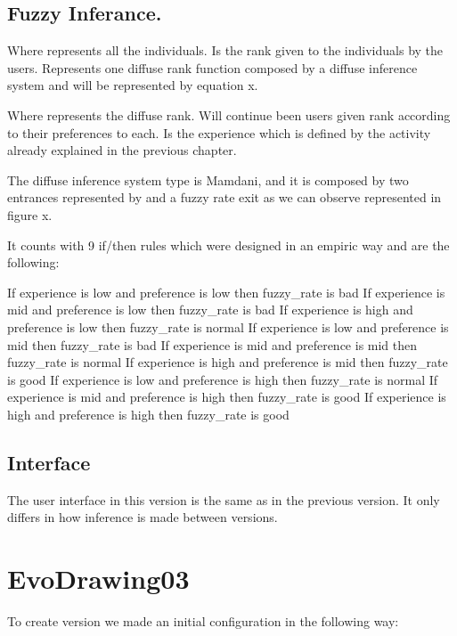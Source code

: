 \subsection{Fuzzy Inferance.}
Where represents all the individuals.
Is the rank given to the individuals by the users.
Represents one diffuse rank function composed by a diffuse inference system and will be represented by equation x.


Where represents the diffuse rank.
Will continue been users given rank according to their preferences to each.
Is the experience which is defined by the activity already explained in the previous chapter.

The diffuse inference system type is Mamdani, and it is composed by two entrances represented by and a fuzzy rate exit as we can observe represented in figure x.


It counts with 9 if/then rules which were designed in an empiric way and are the following:

If experience is low and preference is low then fuzzy\_rate is bad
If experience is mid and preference is low then fuzzy\_rate is bad
If experience is high and preference is low then fuzzy\_rate is normal
If experience is low and preference is mid then fuzzy\_rate is bad
If experience is mid and preference is mid then fuzzy\_rate is normal
If experience is high and preference is mid then fuzzy\_rate is good
If experience is low and preference is high then fuzzy\_rate is normal
If experience is mid and preference is high then fuzzy\_rate is good
If experience is high and preference is high then fuzzy\_rate is good

\subsection{Interface}

The user interface in this version is the same as in the previous version. It only differs in how inference is made between versions.

\section{EvoDrawing03}
To create version we made an initial configuration in the following way:

